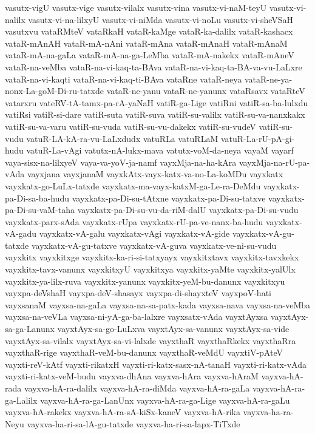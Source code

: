 {vasutx-vigU
vasutx-vige
vasutx-vilalx
vasutx-vina
vasutx-vi-naM-teyU
vasutx-vi-nalilx
vasutx-vi-na-lilxyU
vasutx-vi-niMda
vasutx-vi-noLu
vasutx-vi-sheVSaH
vasutxvu
vataRMteV
vataRkaH
vataR-kaMge
vataR-ka-dalilx
vataR-kashacx
vataR-mAnAH
vataR-mA-nAni
vataR-mAna
vataR-mAnaH
vataR-mAnaM
vataR-mA-na-gaLa
vataR-mA-na-ga-LeMba
vataR-mA-nakekx
vataR-mAneV
vataR-na-veMba
vataR-na-vi-kaq-ta-BAva
vataR-na-vi-kaq-ta-BA-va-vu-LaLxre
vataR-na-vi-kaqti
vataR-na-vi-kaq-ti-BAva
vataRne
vataR-neya
vataR-ne-ya-nonx-La-goM-Di-ru-tatxde
vataR-ne-yanu
vataR-ne-yanunx
vataRsavx
vataRteV
vatarxru
vateRV-tA-tamx-pa-rA-yaNaH
vatiR-ga-Lige
vatiRni
vatiR-sa-ba-lulxdu
vatiRsi
vatiR-si-dare
vatiR-suta
vatiR-suva
vatiR-su-valilx
vatiR-su-va-nanxkakx
vatiR-su-va-varu
vatiR-su-vuda
vatiR-su-vu-dakekx
vatiR-su-vudeV
vatiR-su-vudu
vatuR-LA-kA-ra-vu-LaLxdudx
vatuRLa
vatuRLaM
vatuR-La-rU-pA-gi-hudu
vatuR-La-vAgi
vatutx-nA-lukx-mava
vatutx-voM-da-neya
vayaM
vayarf
vaya-sisx-na-lilxyeV
vaya-va-yoV-ja-namf
vayxMja-na-ha-kAra
vayxMja-na-rU-pa-vAda
vayxjana
vayxjanaM
vayxkAtx-vayx-katx-va-no-La-koMDu
vayxkatx
vayxkatx-go-LuLx-tatxde
vayxkatx-ma-vayx-katxM-ga-Le-ra-DeMdu
vayxkatx-pa-Di-sa-ba-hudu
vayxkatx-pa-Di-su-tAtxne
vayxkatx-pa-Di-su-tatxve
vayxkatx-pa-Di-su-vaM-taha
vayxkatx-pa-Di-su-vu-da-riM-dalU
vayxkatx-pa-Di-su-vudu
vayxkatx-parx-sAda
vayxkatx-rUpa
vayxkatx-rU-pa-ve-nanx-ba-hudu
vayxkatx-vA-gadu
vayxkatx-vA-galu
vayxkatx-vAgi
vayxkatx-vA-gide
vayxkatx-vA-gu-tatxde
vayxkatx-vA-gu-tatxve
vayxkatx-vA-guva
vayxkatx-ve-ni-su-vudu
vayxkitx
vayxkitxge
vayxkitx-ka-ri-si-tatxyayx
vayxkitxtavx
vayxkitx-tavxkekx
vayxkitx-tavx-vanunx
vayxkitxyU
vayxkitxya
vayxkitx-yaMte
vayxkitx-yalUlx
vayxkitx-ya-lilx-ruva
vayxkitx-yanunx
vayxkitx-yeM-bu-danunx
vayxkitxyu
vayxpa-deVshaH
vayxpa-deV-shasayx
vayxpa-di-shayxteV
vayxpoV-hati
vayxsanaM
vayxsa-na-gaLa
vayxsa-na-sa-patx-kada
vayxsa-nava
vayxsa-na-veMba
vayxsa-na-veVLa
vayxsa-ni-yA-ga-ba-lalxre
vayxsatx-vAda
vayxtAyxsa
vayxtAyx-sa-ga-Lanunx
vayxtAyx-sa-go-LuLxva
vayxtAyx-sa-vanunx
vayxtAyx-sa-vide
vayxtAyx-sa-vilalx
vayxtAyx-sa-vi-lalxde
vayxthaR
vayxthaRkekx
vayxthaRra
vayxthaR-rige
vayxthaR-veM-bu-danunx
vayxthaR-veMdU
vayxtiV-pAteV
vayxti-reV-kAtf
vayxti-rikatxH
vayxti-ri-katx-sasx-nA-tanaH
vayxti-ri-katx-vAda
vayxti-ri-katx-veM-budu
vayxva-dhAna
vayxva-hAra
vayxva-hAraM
vayxva-hA-rada
vayxva-hA-ra-dalilx
vayxva-hA-ra-diMda
vayxva-hA-ra-gaLa
vayxva-hA-ra-ga-Lalilx
vayxva-hA-ra-ga-LanUnx
vayxva-hA-ra-ga-Lige
vayxva-hA-ra-gaLu
vayxva-hA-rakekx
vayxva-hA-ra-sA-kiSx-kaneV
vayxva-hA-rika
vayxva-ha-ra-Neyu
vayxva-ha-ri-sa-lA-gu-tatxde
vayxva-ha-ri-sa-lapx-TiTxde
}
